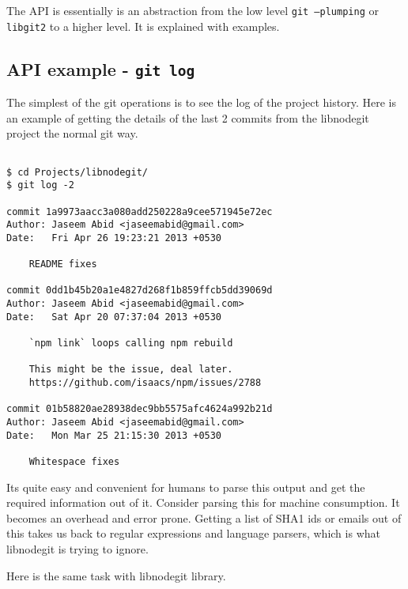 The API is essentially is an abstraction from the low level \texttt{git
  --plumping} or \texttt{libgit2} to a higher level. It is explained with
examples.

\subsection{API example - \texttt{git log}}

The simplest of the git operations is to see the log of the project history.
Here is an example of getting the details of the last 2 commits from the
libnodegit project the normal git way.

\begin{verbatim}

$ cd Projects/libnodegit/
$ git log -2

commit 1a9973aacc3a080add250228a9cee571945e72ec
Author: Jaseem Abid <jaseemabid@gmail.com>
Date:   Fri Apr 26 19:23:21 2013 +0530

    README fixes

commit 0dd1b45b20a1e4827d268f1b859ffcb5dd39069d
Author: Jaseem Abid <jaseemabid@gmail.com>
Date:   Sat Apr 20 07:37:04 2013 +0530

    `npm link` loops calling npm rebuild

    This might be the issue, deal later.
    https://github.com/isaacs/npm/issues/2788

commit 01b58820ae28938dec9bb5575afc4624a992b21d
Author: Jaseem Abid <jaseemabid@gmail.com>
Date:   Mon Mar 25 21:15:30 2013 +0530

    Whitespace fixes

\end{verbatim}

Its quite easy and convenient for humans to parse this output and get the
required information out of it. Consider parsing this for machine consumption.
It becomes an overhead and error prone. Getting a list of SHA1 ids or emails out
of this takes us back to regular expressions and language parsers, which is what
libnodegit is trying to ignore.

Here is the same task with libnodegit library.

